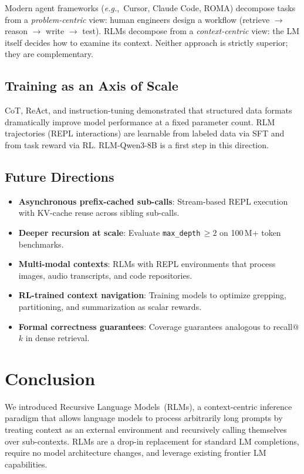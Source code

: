 \documentclass[journal, 10pt, letterpaper]{IEEEtran}
\newcommand{\code}[1]{\texttt{#1}}
\newcommand{\eg}{\textit{e.g.},\ }
\begin{document}
Modern agent frameworks (\eg Cursor, Claude Code, ROMA) decompose tasks from
a \emph{problem-centric} view: human engineers design a workflow (retrieve
$\to$ reason $\to$ write $\to$ test).  RLMs decompose from a
\emph{context-centric} view: the LM itself decides how to examine its context.
Neither approach is strictly superior; they are complementary.

\subsection{Training as an Axis of Scale}

CoT, ReAct, and instruction-tuning demonstrated that structured data formats
dramatically improve model performance at a fixed parameter count.  RLM
trajectories (REPL interactions) are learnable from labeled data via SFT and
from task reward via RL.  RLM-Qwen3-8B is a first step in this direction.

\subsection{Future Directions}

\begin{itemize}
  \item \textbf{Asynchronous prefix-cached sub-calls}: Stream-based REPL
    execution with KV-cache reuse across sibling sub-calls.
  \item \textbf{Deeper recursion at scale}: Evaluate \code{max\_depth}\,$\ge 2$
    on 100\,M+ token benchmarks.
  \item \textbf{Multi-modal contexts}: RLMs with REPL environments that process
    images, audio transcripts, and code repositories.
  \item \textbf{RL-trained context navigation}: Training models to optimize
    grepping, partitioning, and summarization as scalar rewards.
  \item \textbf{Formal correctness guarantees}: Coverage guarantees analogous
    to recall@$k$ in dense retrieval.
\end{itemize}

\section{Conclusion}
\label{sec:conclusion}

We introduced Recursive Language Models~(RLMs), a context-centric inference
paradigm that allows language models to process arbitrarily long prompts by
treating context as an external environment and recursively calling themselves
over sub-contexts.  RLMs are a drop-in replacement for standard LM
completions, require no model architecture changes, and leverage existing
frontier LM capabilities.
\end{document}
